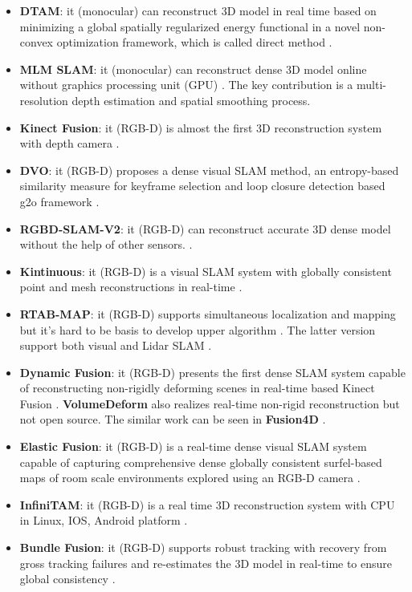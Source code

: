 \documentclass[journal,transmag]{IEEEtran}
\begin{document}
\begin{itemize}
    \item \textbf{DTAM}:  it (monocular) can reconstruct 3D model in real time based on minimizing a global spatially regularized energy functional in a novel non-convex optimization framework, which is called direct method \cite{civera2008inverse}\cite{newcombe2011dtam}.
    \item \textbf{MLM SLAM}: it (monocular) can reconstruct dense 3D model online without graphics processing unit (GPU) \cite{greene2016multi}. The key contribution is a multi-resolution depth estimation and spatial smoothing process.
    \item \textbf{Kinect Fusion}: it (RGB-D) is almost the first 3D reconstruction system with depth camera \cite{newcombe2011kinectfusion}\cite{izadi2011kinectfusion}.
    \item \textbf{DVO}: it (RGB-D)  proposes a dense visual SLAM method, an entropy-based similarity measure for keyframe selection and loop closure detection based g2o framework \cite{steinbrucker2011real}\cite{kerl2013robust}\cite{kerl2013dense}.
    \item \textbf{RGBD-SLAM-V2}: it (RGB-D) can reconstruct accurate 3D dense model without the help of other sensors. \cite{endres20133}.
    \item \textbf{Kintinuous}: it (RGB-D) is a visual SLAM system with globally consistent point and mesh reconstructions in real-time \cite{whelan2012kintinuous}\cite{whelan2015real}\cite{Whelan2011Robust}.
    \item \textbf{RTAB-MAP}: it (RGB-D) supports simultaneous localization and mapping but it's hard to be basis to develop upper algorithm \cite{labbe2014online}\cite{labbeappearance}\cite{labbe2011memory}. The latter version support both visual and Lidar SLAM \cite{labbe2019rtab}.
    \item \textbf{Dynamic Fusion}: it (RGB-D) presents the first dense SLAM system capable of reconstructing non-rigidly deforming scenes in real-time based Kinect Fusion \cite{newcombe2015dynamicfusion}. \textbf{VolumeDeform} \cite{innmann2016volumedeform} also realizes real-time non-rigid reconstruction but not open source. The similar work can be seen in \textbf{Fusion4D} \cite{dou2016fusion4d}.
    \item \textbf{Elastic Fusion}: it (RGB-D) is a real-time dense visual SLAM system capable of capturing comprehensive dense globally consistent surfel-based maps of room scale environments explored using an RGB-D camera \cite{whelan2015elasticfusion}\cite{whelan2016elasticfusion}.
    \item \textbf{InfiniTAM}: it (RGB-D) is a real time 3D reconstruction system with CPU in Linux, IOS, Android platform \cite{InfiniTAM_ISMAR_2015}\cite{InfiniTAM_arXiv_2017}\cite{InfiniTAM_ECCV_2016}.
    \item \textbf{Bundle Fusion}: it (RGB-D) supports robust tracking with recovery from gross tracking failures and re-estimates the 3D model in real-time to ensure global consistency \cite{dai2017bundlefusion}.
\end{itemize}
\end{document}
